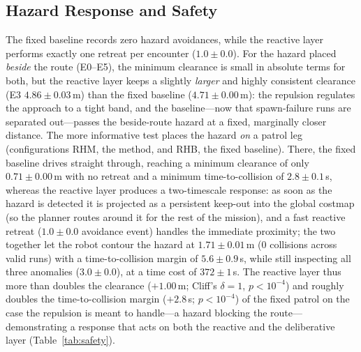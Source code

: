 \subsection{Hazard Response and Safety}
\label{sec:safety}
The fixed baseline records zero hazard avoidances, while the reactive layer
performs exactly one retreat per encounter ($1.0\pm0.0$). For the hazard placed
\emph{beside} the route (E0--E5), the minimum clearance is small in absolute
terms for both, but the reactive layer keeps a slightly \emph{larger} and highly
consistent clearance (E3 $4.86\pm0.03$\,m) than the fixed baseline
($4.71\pm0.00$\,m): the repulsion regulates the approach to a tight band, and
the baseline---now that spawn-failure runs are separated out---passes the
beside-route hazard at a fixed, marginally closer distance. The more informative
test places the hazard \emph{on} a patrol leg (configurations RHM, the method,
and RHB, the fixed baseline). There, the fixed baseline drives straight through,
reaching a minimum clearance of only $0.71\pm0.00$\,m with no retreat and a
minimum time-to-collision of $2.8\pm0.1$\,s, whereas the reactive layer produces
a two-timescale response: as soon as the hazard is detected it is projected as a
persistent keep-out into the global costmap (so the planner routes around it for the
rest of the mission), and a fast reactive retreat ($1.0\pm0.0$ avoidance event)
handles the immediate proximity; the two together let the robot contour the hazard
at $1.71\pm0.01$\,m ($0$ collisions across valid runs) with a time-to-collision
margin of $5.6\pm0.9$\,s, while still inspecting all three anomalies ($3.0\pm0.0$),
at a time cost of $372\pm1$\,s. The
reactive layer thus more than doubles the clearance
($+1.00$\,m; Cliff's $\delta=1$, $p<10^{-4}$) and roughly doubles the
time-to-collision margin ($+2.8$\,s; $p<10^{-4}$) of the fixed patrol on the case
the repulsion is meant to
handle---a hazard blocking the route---demonstrating a response that acts on both
the reactive and the deliberative layer (Table~\ref{tab:safety}).

